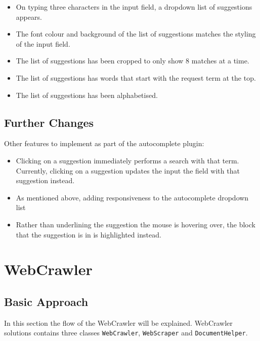 \begin{itemize}
    \item On typing three characters in the input field, a dropdown list of suggestions appears.
    \item The font colour and background of the list of suggestions matches the styling of the input field.
    \item The list of suggestions has been cropped to only show 8 matches at a time.
    \item The list of suggestions has words that start with the request term at the top.
    \item The list of suggestions has been alphabetised.
\end{itemize}

\subsection{Further Changes}
Other features to implement as part of the autocomplete plugin:

\begin{itemize}
    \item Clicking on a suggestion immediately performs a search with that term. Currently, clicking on a suggestion updates the input the field with that suggestion instead.
    \item As mentioned above, adding responsiveness to the autocomplete dropdown list
    \item Rather than underlining the suggestion the mouse is hovering over, the block that the suggestion is in is highlighted instead.
\end{itemize}

\section{WebCrawler}
\subsection{Basic Approach}

In this section the flow of the WebCrawler will be explained.
WebCrawler solutions contains three classes {\tt WebCrawler}, {\tt WebScraper} and {\tt DocumentHelper}.

